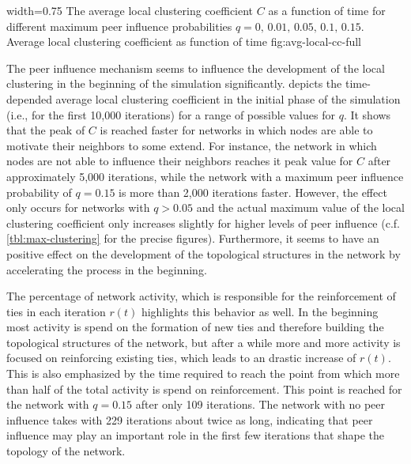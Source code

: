       {width=0.75\textwidth}
      {The average local clustering coefficient \( C \) as a function of time for different maximum peer influence probabilities \( q = 0, \, 0.01, \, 0.05, \, 0.1, \, 0.15\). }
      {Average local clustering coefficient as function of time}
      {fig:avg-local-cc-full}


The peer influence mechanism seems to influence the development of the local clustering in the beginning of the simulation significantly.
 depicts the time-depended average local clustering coefficient in the initial phase of the simulation (i.e., for the first 10,000 iterations) for a range of possible values for \( q \).
It shows that the peak of \( C \) is reached faster for networks in which nodes are able to motivate their neighbors to some extend.
For instance, the network in which nodes are not able to influence their neighbors reaches it peak value for \( C \) after approximately 5,000 iterations, while the network with a maximum peer influence probability of \( q = 0.15 \) is more than 2,000 iterations faster.
However, the effect only occurs for networks with \( q > 0.05 \) and the actual maximum value of the local clustering coefficient only increases slightly for higher levels of peer influence (c.f. \cref{tbl:max-clustering} for the precise figures).
Furthermore, it seems to have an positive effect on the development of the topological structures in the network by accelerating the process in the beginning.

The percentage of network activity, which is responsible for the reinforcement of ties in each iteration \( r(t) \) highlights this behavior as well.
In the beginning most activity is spend on the formation of new ties and therefore building the topological structures of the network, but after a while more and more activity is focused on reinforcing existing ties, which leads to an drastic increase of \( r(t) \).
This is also emphasized by the time required to reach the point from which more than half of the total activity is spend on reinforcement.
This point is reached for the network with \( q = 0.15 \) after only 109 iterations.
The network with no peer influence takes with 229 iterations about twice as long, indicating that peer influence may play an important role in the first few iterations that shape the topology of the network.


